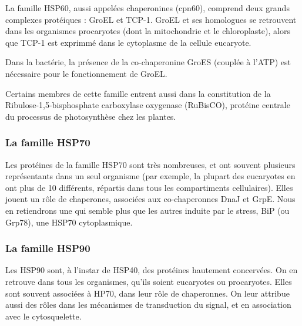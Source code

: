   La famille HSP60, aussi appelées chaperonines (cpn60), comprend deux grands
  complexes protéiques : GroEL et TCP-1. GroEL et ses homologues se retrouvent
  dans les organismes procaryotes (dont la mitochondrie et le chloroplaste),
  alors que TCP-1 est exprimmé dans le cytoplasme de la cellule eucaryote.

  Dans la bactérie, la présence de la co-chaperonine GroES (couplée à l'ATP)
  est nécessaire pour le fonctionnement de GroEL.

  Certains membres de cette famille entrent aussi dans la constitution de la
  Ribulose-1,5-bisphosphate carboxylase oxygenase (RuBisCO), protéine centrale
  du processus de photosynthèse chez les plantes.

\subsubsection{La famille HSP70} %
\label{ssub:la_famille_hsp70}

  Les protéines de la famille HSP70 sont très nombreuses, et ont souvent
  plusieurs représentants dans un seul organisme (par exemple, la plupart des
  eucaryotes en ont plus de 10 différents, répartis dans tous les
  compartiments cellulaires). Elles jouent un rôle de chaperones, associées
  aux co-chaperonnes DnaJ et GrpE. Nous en retiendrons une qui semble plus que
  les autres induite par le stress, BiP (ou Grp78), une HSP70 cytoplasmique.

\subsubsection{La famille HSP90} %
\label{ssub:la_famille_hsp90}


  Les HSP90 sont, à l'instar de HSP40, des protéines hautement concervées. On
  en retrouve dans tous les organismes, qu’ils soient eucaryotes ou
  procaryotes. Elles sont souvent associées à HP70, dans leur rôle de
  chaperonnes. On leur attribue aussi des rôles dans les mécanismes de
  transduction du signal, et en association avec le cytosquelette.

